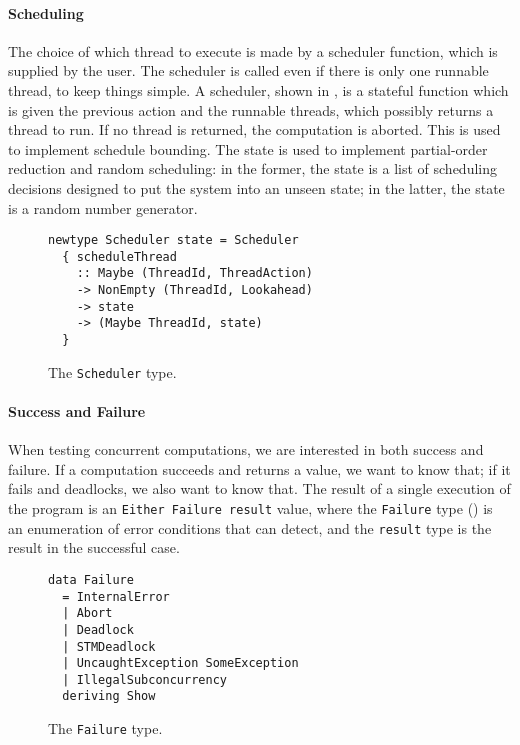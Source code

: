 \paragraph{Scheduling}
The choice of which thread to execute is made by a scheduler function, which is
supplied by the user.  The scheduler is called even if there is only one
runnable thread, to keep things simple.  A scheduler, shown in
, is a stateful function which is given the previous action
and the runnable threads, which possibly returns a thread to run.  If no thread
is returned, the computation is aborted.  This is used to implement schedule
bounding.  The state is used to implement partial-order reduction and random
scheduling: in the former, the state is a list of scheduling decisions designed
to put the system into an unseen state; in the latter, the state is a random
number generator.

\begin{figure}[t]
  \centering
  \begin{lstlisting}
newtype Scheduler state = Scheduler
  { scheduleThread
    :: Maybe (ThreadId, ThreadAction)
    -> NonEmpty (ThreadId, Lookahead)
    -> state
    -> (Maybe ThreadId, state)
  }
  \end{lstlisting}
  \caption{The \texttt{Scheduler} type.}
  \label{fig:scheduler}
\end{figure}

\paragraph{Success and Failure}
When testing concurrent computations, we are interested in both
success and failure.  If a computation succeeds and returns a value,
we want to know that; if it fails and deadlocks, we also want to know
that.  The result of a single execution of the program is an
\verb|Either Failure result| value, where the \verb|Failure| type
() is an enumeration of error conditions that
\dejafu{} can detect, and the \verb|result| type is the result in the
successful case.

\begin{figure}[t]
  \centering
  \begin{lstlisting}
data Failure
  = InternalError
  | Abort
  | Deadlock
  | STMDeadlock
  | UncaughtException SomeException
  | IllegalSubconcurrency
  deriving Show
  \end{lstlisting}
  \caption{The \texttt{Failure} type.}
  \label{fig:Failure}
\end{figure}

